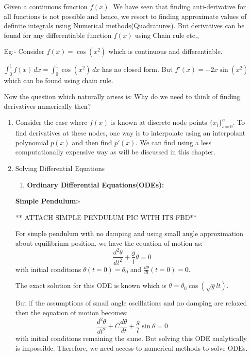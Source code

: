 \documentclass[
]{book}
\providecommand{\tightlist}{%
  \setlength{\itemsep}{0pt}\setlength{\parskip}{0pt}}
\begin{document}
Given a continuous function \(f(x)\). We have seen that finding anti-derivative for all functions is not possible and hence, we resort to finding approximate values of definite integrals using Numerical methods(Quadratures). But derivatives can be found for any differentiable function \(f(x)\) using Chain rule etc.,

Eg:- Consider \(f(x) = \cos(x^2)\) which is continuous and differentiable.

\(\int_0^1 f(x) \, dx = \int_0^1 \cos(x^2)\, dx\) has no closed form. But \(f'(x) = -2x\sin(x^2)\) which can be found using chain rule.

Now the question which naturally arises is: Why do we need to think of finding derivatives numerically then?

\begin{enumerate}
\def\labelenumi{\arabic{enumi}.}
\item
  Consider the case where \(f(x)\) is known at discrete node points \(\{x_i\}_{i=0}^n\). To find derivatives at these nodes, one way is to interpolate using an interpolant polynomial \(p(x)\) and then find \(p'(x)\). We can find using a less computationally expensive way as will be discussed in this chapter.
\item
  Solving Differential Equations

  \begin{enumerate}
  \def\labelenumii{\alph{enumii}.}
  \tightlist
  \item
    \textbf{Ordinary Differential Equations(ODEs):}
  \end{enumerate}

  \textbf{Simple Pendulum:-}

  ** ATTACH SIMPLE PENDULUM PIC WITH ITS FBD**

  For simple pendulum with no damping and using small angle approximation about equilibrium position, we have the equation of motion as:
  \begin{equation}
   \frac{d^2\theta}{dt^2}+\frac{g}{l}\theta = 0
   \end{equation}
  with initial conditions \(\theta(t=0)= \theta_0\) and \(\frac{d\theta}{dt}(t=0) = 0\).

  The exact solution for this ODE is known which is \(\theta = \theta_0 \cos\left( \sqrt{g}{l} t \right)\).

  But if the assumptions of small angle oscillations and no damping are relaxed then the equation of motion becomes:
  \begin{equation}
   \frac{d^2\theta}{dt^2}+C\frac{d\theta}{dt}+\frac{g}{l}\sin \theta = 0
   \end{equation}
  with initial conditions remaining the same. But solving this ODE analytically is impossible. Therefore, we need access to numerical methods to solve ODEs.


\end{enumerate}
\end{document}
